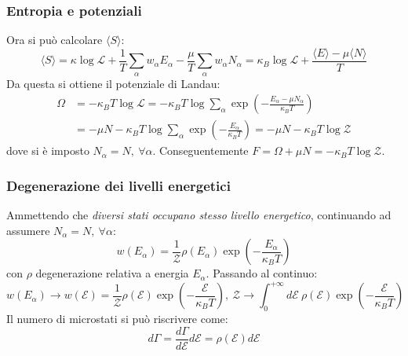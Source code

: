 \documentclass[10pt, a4paper]{scrartcl}
\numberwithin{equation}{subsection}
\theoremstyle{style1}
\begin{document}
\subsubsection{Entropia e potenziali}
Ora si pu\`o calcolare $\langle S \rangle$:
\begin{equation}
	\langle S  \rangle = \kappa \log \mathscr{L} + \frac{1}{T} \sum_{\alpha }^{} w_\alpha  E_\alpha - \frac{\mu }{T} \sum_{\alpha }^{} w_\alpha  N_\alpha = \kappa _B \log\mathscr{L} + \frac{\langle E \rangle - \mu  \langle N \rangle}{T}
\end{equation}
Da questa si ottiene il potenziale di Landau:
\begin{equation}
	\begin{split}
		\Omega &= -\kappa _B T \log \mathscr{L}  = -\kappa _B T \log \sum_{\alpha }^{} \exp \left(- \frac{E_\alpha -\mu N_\alpha }{\kappa _B T}\right)  \\
		       &= -\mu  N - \kappa _B T \log \sum_{\alpha }^{} \exp \left( -\frac{E_\alpha }{\kappa _B T}\right) = -\mu  N- \kappa _B T \log\mathscr{Z}
	\end{split}
\end{equation}
dove si \`e imposto $N_\alpha  = N , \ \forall \alpha $. Conseguentemente $F = \Omega +\mu N = - \kappa _B T \log\mathscr{Z}$. 

\subsubsection{Degenerazione dei livelli energetici}

Ammettendo che \textit{diversi stati occupano stesso livello energetico}, continuando ad assumere $N_\alpha  = N , \ \forall \alpha $:
\begin{equation}
	w(E_\alpha )= \frac{1}{\mathscr{Z}} \rho (E_\alpha ) \exp \left( - \frac{E_\alpha }{\kappa _B T}\right) 
\end{equation}
con $\rho $ degenerazione relativa a energia $E_\alpha $. Passando al continuo:
\begin{equation}
	w(E_\alpha ) \to w (\mathscr{E}) = \frac{1}{\mathscr{Z}} \rho (\mathscr{E}) \exp \left(- \frac{\mathscr{E}}{\kappa _BT}\right) , \ \mathscr{Z}\to \int_{0} ^{+\infty} d \mathscr{E}\ \rho (\mathscr{E}) \exp\left(- \frac{\mathscr{E}}{\kappa _BT}\right) 
\end{equation}
Il numero di microstati si pu\`o riscrivere come:
\begin{equation}
	d\Gamma = \frac{d\Gamma}{d \mathscr{E}}d\mathscr{E} = \rho (\mathscr{E}) d \mathscr{E}
\end{equation}
\end{document}
